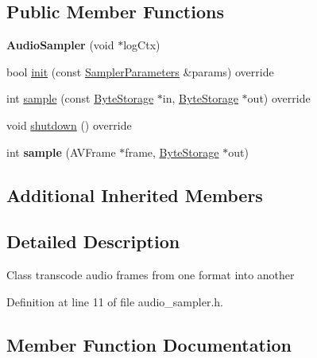 \subsection*{Public Member Functions}
\begin{DoxyCompactItemize}
\item 
\mbox{\label{classffmpeg_1_1AudioSampler_ae7fd59e065f7f827bdf164ccfa80dc56}} 
{\bfseries Audio\+Sampler} (void $\ast$log\+Ctx)
\item 
bool \hyperlink{classffmpeg_1_1AudioSampler_a90df92f5b3a265e0cfa9ee44d9e8871b}{init} (const \hyperlink{structffmpeg_1_1SamplerParameters}{Sampler\+Parameters} \&params) override
\item 
int \hyperlink{classffmpeg_1_1AudioSampler_a2188529ebad9ef4593a5ab11e8236989}{sample} (const \hyperlink{classffmpeg_1_1ByteStorage}{Byte\+Storage} $\ast$in, \hyperlink{classffmpeg_1_1ByteStorage}{Byte\+Storage} $\ast$out) override
\item 
void \hyperlink{classffmpeg_1_1AudioSampler_a703ec8da8cc9e6e9701bed75cbc40085}{shutdown} () override
\item 
\mbox{\label{classffmpeg_1_1AudioSampler_ab7ac3c8e9a0c6cc1984057ee0307b732}} 
int {\bfseries sample} (A\+V\+Frame $\ast$frame, \hyperlink{classffmpeg_1_1ByteStorage}{Byte\+Storage} $\ast$out)
\end{DoxyCompactItemize}
\subsection*{Additional Inherited Members}


\subsection{Detailed Description}
Class transcode audio frames from one format into another 

Definition at line 11 of file audio\+\_\+sampler.\+h.



\subsection{Member Function Documentation}
\mbox{\label{classffmpeg_1_1AudioSampler_a90df92f5b3a265e0cfa9ee44d9e8871b}} 
